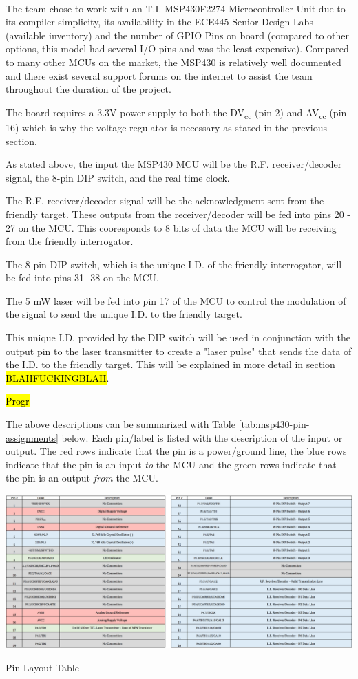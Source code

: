 \documentclass[letterpaper,10pt]{article}
\begin{document}
\begin{spacing}{1.15}
The team chose to work with an T.I. MSP430F2274 Microcontroller Unit \textsuperscript{\cite{MSP430F2274}} due to its compiler simplicity, its availability in the ECE445 Senior Design Labs (available inventory) and the number of GPIO Pins on board (compared to other options, this model had several I/O pins and was the least expensive). Compared to many other MCUs on the market, the MSP430 is relatively well documented and there exist several support forums on the internet to assist the team throughout the duration of the project.

The board requires a 3.3V power supply to both the DV\textsubscript{cc} (pin 2) and AV\textsubscript{cc} (pin 16) which is why the voltage regulator is necessary as stated in the previous section. 

As stated above, the input the MSP430 MCU will be the R.F. receiver/decoder signal, the 8-pin DIP switch, and the real time clock.

The R.F. receiver/decoder signal will be the acknowledgment sent from the friendly target. These outputs from the receiver/decoder will be fed into pins 20 - 27 on the MCU. This cooresponds to 8 bits of data the MCU will be receiving from the friendly interrogator.

The 8-pin DIP switch, which is the unique I.D. of the friendly interrogator, will be fed into pins 31 -38 on the MCU. 

The 5 mW laser will be fed into pin 17 of the MCU to control the modulation of the signal to send the unique I.D. to the friendly target. 

This unique I.D. provided by the DIP switch will be used in conjunction with the output pin to the laser transmitter to create a "laser pulse" that sends the data of the I.D. to the friendly target. This will be explained in more detail in section \hl{BLAHFUCKINGBLAH}.

\hl{Progr}

The above descriptions can be summarized with Table \ref{tab:msp430-pin-assignments} below. Each pin/label is listed with the description of the input or output. The red rows indicate that the pin is a power/ground line, the blue rows indicate that the pin is an input \textit{to} the MCU and the green rows indicate that the pin is an output \textit{from} the MCU. 

\begin{table} [H]
	\centering
	\includegraphics[scale=0.37]{MSP430_Pin_Assignments.png}
	\caption{Pin Layout Table\label{tab:msp430-pin-assignments}}
\end{table}


\end{spacing}
\end{document}

